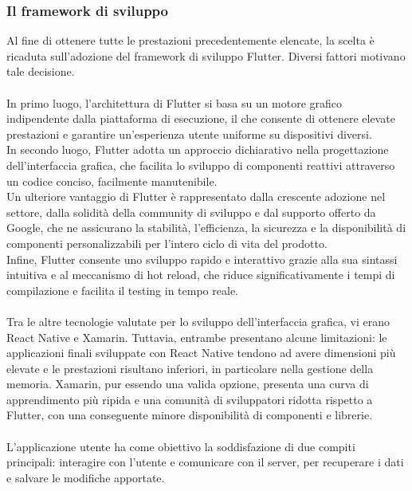 \subsubsection{Il framework di sviluppo}
Al fine di ottenere tutte le prestazioni precedentemente elencate, 
la scelta è ricaduta sull’adozione del framework di sviluppo Flutter.
Diversi fattori motivano tale decisione. \\
\\
In primo luogo, l'architettura di Flutter si basa su un motore grafico indipendente dalla piattaforma di esecuzione,
il che consente di ottenere elevate prestazioni e garantire un'esperienza utente uniforme su dispositivi diversi. \\
In secondo luogo, Flutter adotta un approccio dichiarativo nella progettazione dell'interfaccia grafica,
che facilita lo sviluppo di componenti reattivi attraverso un codice conciso, facilmente manutenibile.\\
Un ulteriore vantaggio di Flutter è rappresentato dalla crescente adozione nel settore,
dalla solidità della community di sviluppo e dal supporto offerto da Google,
che ne assicurano la stabilità, l'efficienza, la sicurezza e la disponibilità di componenti personalizzabili per l'intero ciclo di vita del prodotto.\\
Infine, Flutter consente uno sviluppo rapido e interattivo grazie alla sua sintassi intuitiva e al meccanismo di hot reload,
che riduce significativamente i tempi di compilazione e facilita il testing in tempo reale.\\
\\
Tra le altre tecnologie valutate per lo sviluppo dell'interfaccia grafica, vi erano React Native e Xamarin.
Tuttavia, entrambe presentano alcune limitazioni: 
le applicazioni finali sviluppate con React Native tendono ad avere dimensioni più elevate e le prestazioni risultano inferiori,
in particolare nella gestione della memoria.
Xamarin, pur essendo una valida opzione, presenta una curva di apprendimento più ripida e 
una comunità di sviluppatori ridotta rispetto a Flutter,
con una conseguente minore disponibilità di componenti e librerie.\\
\\
L'applicazione utente ha come obiettivo la soddisfazione di due compiti principali: interagire con l'utente e 
comunicare con il server, per recuperare i dati e salvare le modifiche apportate.

\clearpage


